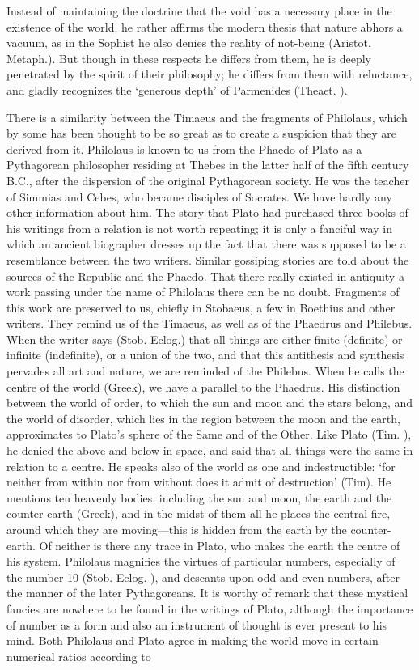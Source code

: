 \documentclass[11pt,letter]{article}
\begin{document}
Instead of maintaining the doctrine that the void has a necessary place in the existence of the world, he rather affirms the modern thesis that nature abhors a vacuum, as in the Sophist he also denies the reality of not-being (Aristot. Metaph.). But though in these respects he differs from them, he is deeply penetrated by the spirit of their philosophy; he differs from them with reluctance, and gladly recognizes the ‘generous depth’ of Parmenides (Theaet. ).

\par  There is a similarity between the Timaeus and the fragments of Philolaus, which by some has been thought to be so great as to create a suspicion that they are derived from it. Philolaus is known to us from the Phaedo of Plato as a Pythagorean philosopher residing at Thebes in the latter half of the fifth century B.C., after the dispersion of the original Pythagorean society. He was the teacher of Simmias and Cebes, who became disciples of Socrates. We have hardly any other information about him. The story that Plato had purchased three books of his writings from a relation is not worth repeating; it is only a fanciful way in which an ancient biographer dresses up the fact that there was supposed to be a resemblance between the two writers. Similar gossiping stories are told about the sources of the Republic and the Phaedo. That there really existed in antiquity a work passing under the name of Philolaus there can be no doubt. Fragments of this work are preserved to us, chiefly in Stobaeus, a few in Boethius and other writers. They remind us of the Timaeus, as well as of the Phaedrus and Philebus. When the writer says (Stob. Eclog.) that all things are either finite (definite) or infinite (indefinite), or a union of the two, and that this antithesis and synthesis pervades all art and nature, we are reminded of the Philebus. When he calls the centre of the world (Greek), we have a parallel to the Phaedrus. His distinction between the world of order, to which the sun and moon and the stars belong, and the world of disorder, which lies in the region between the moon and the earth, approximates to Plato’s sphere of the Same and of the Other. Like Plato (Tim. ), he denied the above and below in space, and said that all things were the same in relation to a centre. He speaks also of the world as one and indestructible: ‘for neither from within nor from without does it admit of destruction’ (Tim). He mentions ten heavenly bodies, including the sun and moon, the earth and the counter-earth (Greek), and in the midst of them all he places the central fire, around which they are moving—this is hidden from the earth by the counter-earth. Of neither is there any trace in Plato, who makes the earth the centre of his system. Philolaus magnifies the virtues of particular numbers, especially of the number 10 (Stob. Eclog. ), and descants upon odd and even numbers, after the manner of the later Pythagoreans. It is worthy of remark that these mystical fancies are nowhere to be found in the writings of Plato, although the importance of number as a form and also an instrument of thought is ever present to his mind. Both Philolaus and Plato agree in making the world move in certain numerical ratios according to 
\end{document}
